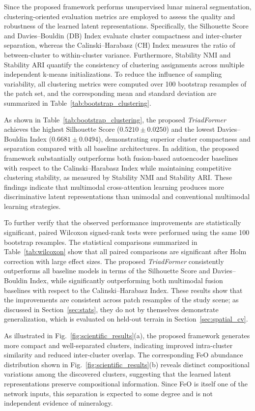 \documentclass[pdflatex,sn-mathphys-num]{sn-jnl}
\begin{document}
Since the proposed framework performs unsupervised lunar mineral segmentation, clustering-oriented evaluation metrics are employed to assess the quality and robustness of the learned latent representations. Specifically, the Silhouette Score and Davies--Bouldin (DB) Index evaluate cluster compactness and inter-cluster separation, whereas the Calinski--Harabasz (CH) Index measures the ratio of between-cluster to within-cluster variance. Furthermore, Stability NMI and Stability ARI quantify the consistency of clustering assignments across multiple independent k-means initializations. To reduce the influence of sampling variability, all clustering metrics were computed over 100 bootstrap resamples of the patch set, and the corresponding mean and standard deviation are summarized in Table~\ref{tab:bootstrap_clustering}.

As shown in Table~\ref{tab:bootstrap_clustering}, the proposed \textit{TriadFormer} achieves the highest Silhouette Score ($0.5210 \pm 0.0250$) and the lowest Davies--Bouldin Index ($0.6681 \pm 0.0494$), demonstrating superior cluster compactness and separation compared with all baseline architectures. In addition, the proposed framework substantially outperforms both fusion-based autoencoder baselines with respect to the Calinski--Harabasz Index while maintaining competitive clustering stability, as measured by Stability NMI and Stability ARI. These findings indicate that multimodal cross-attention learning produces more discriminative latent representations than unimodal and conventional multimodal learning strategies.

To further verify that the observed performance improvements are statistically significant, paired Wilcoxon signed-rank tests were performed using the same 100 bootstrap resamples. The statistical comparisons summarized in Table~\ref{tab:wilcoxon} show that all paired comparisons are significant after Holm correction with large effect sizes. The proposed \textit{TriadFormer} consistently outperforms all baseline models in terms of the Silhouette Score and Davies--Bouldin Index, while significantly outperforming both multimodal fusion baselines with respect to the Calinski--Harabasz Index. These results show that the improvements are consistent across patch resamples of the study scene; as discussed in Section~\ref{sec:stats}, they do not by themselves demonstrate generalization, which is evaluated on held-out terrain in Section~\ref{sec:spatial_cv}.

As illustrated in Fig.~\ref{fig:scientific_results}(a), the proposed framework generates more compact and well-separated clusters, indicating improved intra-cluster similarity and reduced inter-cluster overlap. The corresponding FeO abundance distribution shown in Fig.~\ref{fig:scientific_results}(b) reveals distinct compositional variations among the discovered clusters, suggesting that the learned latent representations preserve compositional information. Since FeO is itself one of the network inputs, this separation is expected to some degree and is not independent evidence of mineralogy.
\end{document}
